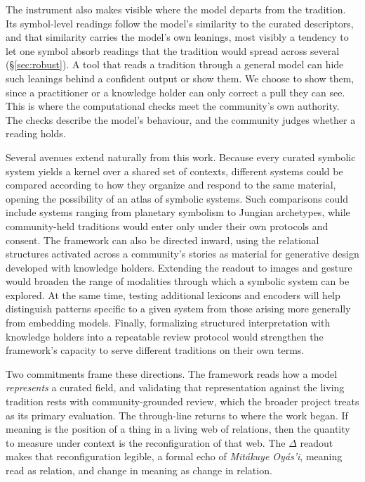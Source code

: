 \documentclass[final,creativeai]{article}
\begin{document}
The instrument also makes visible where the model departs from the tradition. Its symbol-level readings follow the model's similarity to the curated descriptors, and that similarity carries the model's own leanings, most visibly a tendency to let one symbol absorb readings that the tradition would spread across several (\S\ref{sec:robust}). A tool that reads a tradition through a general model can hide such leanings behind a confident output or show them. We choose to show them, since a practitioner or a knowledge holder can only correct a pull they can see. This is where the computational checks meet the community's own authority. The checks describe the model's behaviour, and the community judges whether a reading holds.

Several avenues extend naturally from this work. Because every curated symbolic system yields a kernel over a shared set of contexts, different systems could be compared according to how they organize and respond to the same material, opening the possibility of an atlas of symbolic systems. Such comparisons could include systems ranging from planetary symbolism to Jungian archetypes, while community-held traditions would enter only under their own protocols and consent. The framework can also be directed inward, using the relational structures activated across a community’s stories as material for generative design developed with knowledge holders. Extending the readout to images and gesture would broaden the range of modalities through which a symbolic system can be explored. At the same time, testing additional lexicons and encoders will help distinguish patterns specific to a given system from those arising more generally from embedding models. Finally, formalizing structured interpretation with knowledge holders into a repeatable review protocol would strengthen the framework’s capacity to serve different traditions on their own terms.

Two commitments frame these directions. The framework reads how a model \emph{represents} a curated field, and validating that representation against the living tradition rests with community-grounded review, which the broader project treats as its primary evaluation. The through-line returns to where the work began. If meaning is the position of a thing in a living web of relations, then the quantity to measure under context is the reconfiguration of that web. The $\Delta$ readout makes that reconfiguration legible, a formal echo of \emph{Mitákuye Oyás'i}, meaning read as relation, and change in meaning as change in relation.
\end{document}

